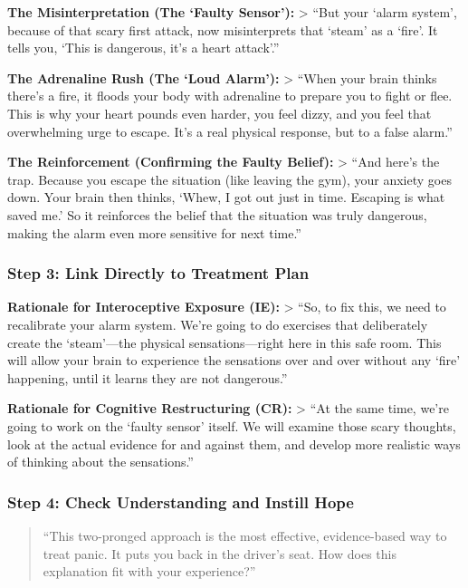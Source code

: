 \documentclass[
  american,
  letterpaper,
  DIV=11,
  numbers=noendperiod]{scrartcl}
\begin{document}
\textbf{The Misinterpretation (The `Faulty Sensor'):} \textgreater{}
``But your `alarm system', because of that scary first attack, now
misinterprets that `steam' as a `fire'. It tells you, `This is
dangerous, it's a heart attack'.''

\textbf{The Adrenaline Rush (The `Loud Alarm'):} \textgreater{} ``When
your brain thinks there's a fire, it floods your body with adrenaline to
prepare you to fight or flee. This is why your heart pounds even harder,
you feel dizzy, and you feel that overwhelming urge to escape. It's a
real physical response, but to a false alarm.''

\textbf{The Reinforcement (Confirming the Faulty Belief):}
\textgreater{} ``And here's the trap. Because you escape the situation
(like leaving the gym), your anxiety goes down. Your brain then thinks,
`Whew, I got out just in time. Escaping is what saved me.' So it
reinforces the belief that the situation was truly dangerous, making the
alarm even more sensitive for next time.''

\subsubsection{Step 3: Link Directly to Treatment
Plan}\label{step-3-link-directly-to-treatment-plan}

\textbf{Rationale for Interoceptive Exposure (IE):} \textgreater{} ``So,
to fix this, we need to recalibrate your alarm system. We're going to do
exercises that deliberately create the `steam'---the physical
sensations---right here in this safe room. This will allow your brain to
experience the sensations over and over without any `fire' happening,
until it learns they are not dangerous.''

\textbf{Rationale for Cognitive Restructuring (CR):} \textgreater{} ``At
the same time, we're going to work on the `faulty sensor' itself. We
will examine those scary thoughts, look at the actual evidence for and
against them, and develop more realistic ways of thinking about the
sensations.''

\subsubsection{Step 4: Check Understanding and Instill
Hope}\label{step-4-check-understanding-and-instill-hope}

\begin{quote}
``This two-pronged approach is the most effective, evidence-based way to
treat panic. It puts you back in the driver's seat. How does this
explanation fit with your experience?''
\end{quote}
\end{document}
